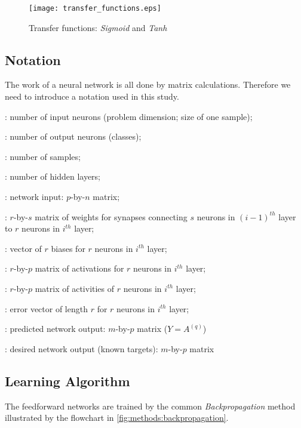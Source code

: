 \begin{figure}[H]
  \centering
  \texttt{[image: transfer\_functions.eps]}
  \caption{Transfer functions: \textit{Sigmoid} and \textit{Tanh}}
  \label{fig:methods:transfer_functions}
\end{figure}

\subsection*{Notation}
The work of a neural network is all done by matrix calculations. Therefore we need to introduce a notation used in this study.

\begin{description}[leftmargin=!,labelwidth=\widthof{\bfseries $ W^{(i)} $}]
\item[$ n $] : number of input neurons (problem dimension; size of one sample);
\item[$ m $] : number of output neurons (classes);
\item[$ p $] : number of samples;
\item[$ q $] : number of hidden layers;
\item[$ X $] : network input: $ p $-by-$ n $ matrix;
\item[$ W^{(i)} $] : $ r $-by-$ s $ matrix of weights for synapses connecting $ s $ neurons in $ (i-1)^{th} $ layer to $ r $ neurons in $ i^{th} $ layer;
\item[$ B^{(i)} $] : vector of $ r $ biases for $ r $ neurons in $ i^{th} $ layer;
\item[$ Z^{(i)} $] : $ r $-by-$ p $ matrix of activations for $ r $ neurons in $ i^{th} $ layer;
\item[$ A^{(i)} $] : $ r $-by-$ p $ matrix of activities of $ r $ neurons in $ i^{th} $ layer;
\item[$ \delta^{(i)} $] : error vector of length $ r $ for $ r $ neurons in $ i^{th} $ layer;
\item[$ Y $] : predicted network output: $ m $-by-$ p $ matrix ($ Y = A^{(q)} $)
\item[$ U $] : desired network output (known targets): $ m $-by-$ p $ matrix
\end{description}

\subsection*{Learning Algorithm}
The feedforward networks are trained by the common \textit{Backpropagation} method illustrated by the flowchart in \cref{fig:methods:backpropagation}.

